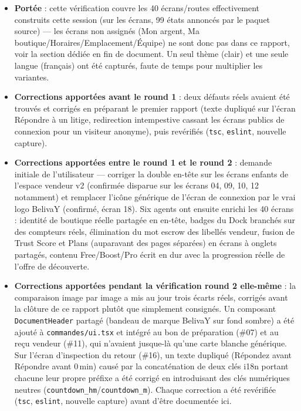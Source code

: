 \documentclass[11pt]{article}
\begin{document}
\begin{itemize}
  \item \textbf{Portée} : cette vérification couvre les 40 écrans/routes effectivement construits cette session (sur les  écrans, 99 états\fg{} annoncés par le paquet source) — les écrans non assignés (Mon argent, Ma boutique/Horaires/Emplacement/Équipe) ne sont donc pas dans ce rapport, voir la section dédiée en fin de document. Un seul thème (clair) et une seule langue (français) ont été capturés, faute de temps pour multiplier les variantes.
  \item \textbf{Corrections apportées avant le round 1} : deux défauts réels avaient été trouvés et corrigés en préparant le premier rapport (texte dupliqué sur l'écran Répondre à un litige, redirection intempestive cassant les écrans publics de connexion pour un visiteur anonyme), puis revérifiés (\texttt{tsc}, \texttt{eslint}, nouvelle capture).
  \item \textbf{Corrections apportées entre le round 1 et le round 2} : demande initiale de l'utilisateur — corriger la double en-tête sur les écrans enfants de l'espace vendeur v2 (confirmée disparue sur les écrans 04, 09, 10, 12 notamment) et remplacer l'icône générique de l'écran de connexion par le vrai logo BelivaY (confirmé, écran 18). Six agents ont ensuite enrichi les 40 écrans : identité de boutique réelle partagée en en-tête, badges du Dock branchés sur des compteurs réels, élimination du mot \og escrow\fg{} des libellés vendeur, fusion de Trust Score et Plans (auparavant des pages séparées) en écrans à onglets partagés, contenu Free/Boost/Pro écrit en dur avec la progression réelle de l'offre de découverte.
  \item \textbf{Corrections apportées pendant la vérification round 2 elle-même} : la comparaison image par image a mis au jour trois écarts réels, corrigés avant la clôture de ce rapport plutôt que simplement consignés. Un composant \texttt{DocumentHeader} partagé (bandeau de marque BelivaY sur fond sombre) a été ajouté à \texttt{commandes/ui.tsx} et intégré au bon de préparation (\#07) et au reçu vendeur (\#11), qui n'avaient jusque-là qu'une carte blanche générique. Sur l'écran d'inspection du retour (\#16), un texte dupliqué (\og Répondez avant Répondre avant 0\,min\fg{}) causé par la concaténation de deux clés i18n portant chacune leur propre préfixe a été corrigé en introduisant des clés numériques neutres (\texttt{countdown\_hm}/\texttt{countdown\_m}). Chaque correction a été revérifiée (\texttt{tsc}, \texttt{eslint}, nouvelle capture) avant d'être documentée ici.
\end{itemize}
\newpage
\end{document}
